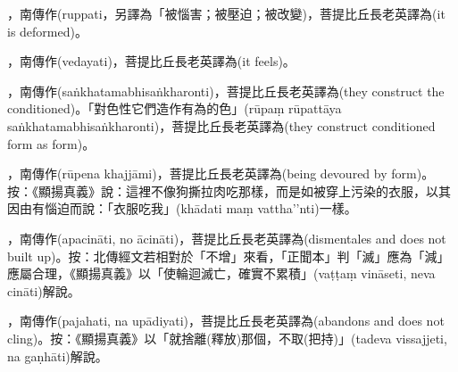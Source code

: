 \startitemgroup[noteitems]
\item{}，南傳作(ruppati，另譯為「被惱害；被壓迫；被改變)，菩提比丘長老英譯為(it is deformed)。
\stopitemgroup

\startitemgroup[noteitems]
\item{}，南傳作(vedayati)，菩提比丘長老英譯為(it feels)。
\stopitemgroup

\startitemgroup[noteitems]
\item{}，南傳作(saṅkhatamabhisaṅkharonti)，菩提比丘長老英譯為(they construct the conditioned)。「對色性它們造作有為的色」(rūpaṃ rūpattāya saṅkhatamabhisaṅkharonti)，菩提比丘長老英譯為(they construct conditioned form as form)。
\stopitemgroup

\startitemgroup[noteitems]
\item{}，南傳作(rūpena khajjāmi)，菩提比丘長老英譯為(being devoured by form)。按：《顯揚真義》說：這裡不像狗撕拉肉吃那樣，而是如被穿上污染的衣服，以其因由有惱迫而說：「衣服吃我」(khādati maṃ vattha’’nti)一樣。
\stopitemgroup

\startitemgroup[noteitems]
\item{}，南傳作(apacināti, no ācināti)，菩提比丘長老英譯為(dismentales and does not built up)。按：北傳經文若相對於「不增」來看，「正聞本」判「滅」應為「減」應屬合理，《顯揚真義》以「使輪迴滅亡，確實不累積」(vaṭṭaṃ vināseti, neva cināti)解說。
\stopitemgroup

\startitemgroup[noteitems]
\item{}，南傳作(pajahati, na upādiyati)，菩提比丘長老英譯為(abandons and does not cling)。按：《顯揚真義》以「就捨離(釋放)那個，不取(把持)」(tadeva vissajjeti, na gaṇhāti)解說。
\stopitemgroup

